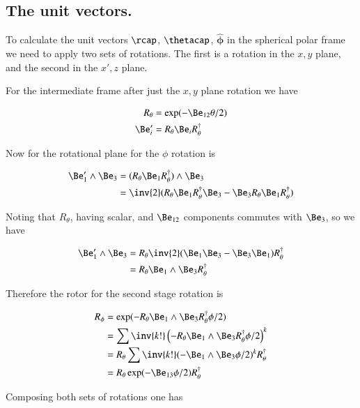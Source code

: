 \documentclass{article}
\newcommand{\phicap}[0]{\hat{\boldsymbol{\phi}}}
\begin{document}
\subsection{ The unit vectors. }

To calculate the unit vectors $\rcap$, $\thetacap$, $\phicap$ in the spherical polar frame we need to apply two sets of rotations.  The first is a rotation 
in the $x,y$ plane, and the second in the $x', z$ plane.

For the intermediate frame after just the $x,y$ plane rotation we have

\begin{align*}
R_\theta &= \exp(-\Be_{12}\theta/2) \\
\Be_i' &= R_\theta \Be_i R_\theta^\dagger
\end{align*}

Now for the rotational plane for the $\phi$ rotation is

\begin{align*}
\Be_1' \wedge \Be_3 
&= (R_\theta \Be_1 R_\theta^\dagger) \wedge \Be_3 \\
&= \inv{2} ( R_\theta \Be_1 R_\theta^\dagger \Be_3 - \Be_3 R_\theta \Be_1 R_\theta^\dagger ) \\
\end{align*}

Noting that $R_\theta$, having scalar, and $\Be_{12}$ components commutes with $\Be_3$, so we have

\begin{align*}
\Be_1' \wedge \Be_3 
&= R_\theta \inv{2} ( \Be_1 \Be_3 - \Be_3 \Be_1 ) R_\theta^\dagger \\
&= R_\theta \Be_1 \wedge \Be_3 R_\theta^\dagger \\
\end{align*}

Therefore the rotor for the second stage rotation is

\begin{align*}
R_\phi 
&= \exp( - R_\theta \Be_1 \wedge \Be_3 R_\theta^\dagger \phi/2 ) \\
&= \sum \inv{k!} \left( - R_\theta \Be_1 \wedge \Be_3 R_\theta^\dagger \phi/2 \right)^k \\
&= R_\theta \sum \inv{k!} ( - \Be_1 \wedge \Be_3 \phi/2 )^k R_\theta^\dagger \\
&= R_\theta \exp( - \Be_{13} \phi/2 ) R_\theta^\dagger \\
\end{align*}

Composing both sets of rotations one has
\end{document}
